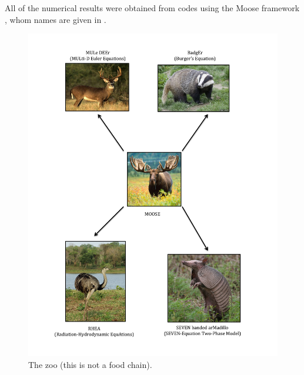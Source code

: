 All of the numerical results were obtained from codes using the Moose framework \cite{Moose}, whom names are given in .
%
\begin{figure}[H]
\centering
\includegraphics[width=\textwidth]{figures/organigram.pdf}
\caption{The zoo (this is not a food chain). \label{fig:organigram}}
\end{figure}
%